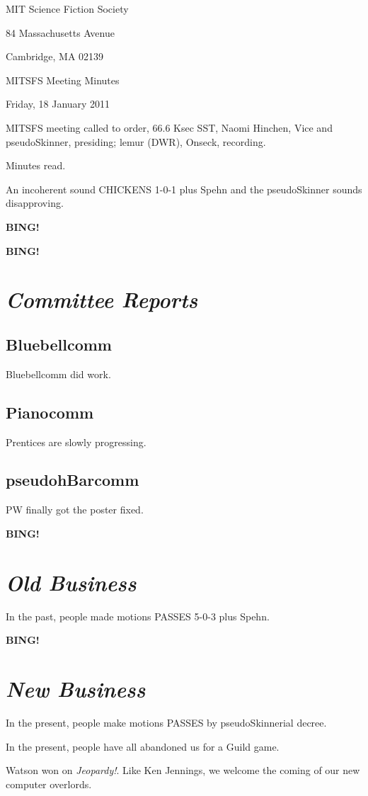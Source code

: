 \documentclass[10pt]{article}
\newcommand{\bing}{{\bf BING!} }
\newcommand{\goto}[1]{\bing \vskip 12pt \section*{{\em{#1}}}}
\newcommand{\ps}{ plus Spehn\xspace}
\newcommand{\skinner}{Naomi Hinchen, Vice and pseudoSkinner}
\newcommand{\onseck}{lemur (DWR), Onseck}
\newcommand{\meetingdate}{Friday, 18 January 2011}
\begin{document}
\begin{center}

MIT Science Fiction Society

84 Massachusetts Avenue

Cambridge, MA 02139

\vspace{12pt}

MITSFS Meeting Minutes

\meetingdate

\end{center}

\vspace{18pt}

\setlength{\parskip}{6pt}

\noindent
MITSFS meeting called to order, 66.6 Ksec SST,
\skinner, presiding; \onseck, recording.

Minutes read.

An incoherent sound CHICKENS 1-0-1\ps and the pseudoSkinner sounds
disapproving.

\bing

\goto{Committee Reports}

\subsection*{Bluebellcomm}

Bluebellcomm did work.

\subsection*{Pianocomm}

Prentices are slowly progressing.

\subsection*{pseudohBarcomm}

PW finally got the poster fixed.


\goto{Old Business}

In the past, people made motions PASSES 5-0-3\ps.


\goto{New Business}

In the present, people make motions PASSES by pseudoSkinnerial decree.

In the present, people have all abandoned us for a Guild game.

Watson won on \emph{Jeopardy!}.  Like Ken Jennings, we welcome
the coming of our new computer overlords.
\end{document}
